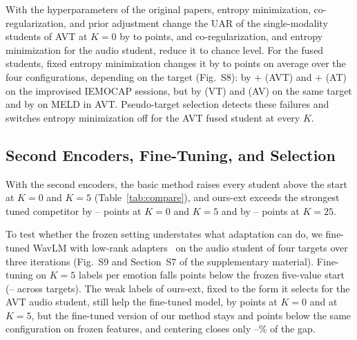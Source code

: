 With the hyperparameters of the original papers, entropy minimization, co-regularization, and prior adjustment change the UAR of the single-modality students of AVT at $K=0$ by  to  points, and co-regularization, and entropy minimization for the audio student, reduce it to chance level.
For the fused students, fixed entropy minimization changes it by  to  points on average over the four configurations, depending on the target (Fig.~S8): by $+$ (AVT) and $+$ (AT) on the improvised IEMOCAP sessions, but by  (VT) and  (AV) on the same target and by  on MELD in AVT.
Pseudo-target selection detects these failures and switches entropy minimization off for the AVT fused student at every $K$.


\subsection{Second Encoders, Fine-Tuning, and Selection}
\label{sec:comparison-robust}

With the second encoders, the basic method raises every student above the start at $K=0$ and $K=5$ (Table~\ref{tab:compare}), and ours-ext exceeds the strongest tuned competitor by -- points at $K=0$ and $K=5$ and by -- points at $K=25$.

To test whether the frozen setting understates what adaptation can do, we fine-tuned WavLM with low-rank adapters~\cite{hu2022lora} on the audio student of four targets over three iterations (Fig.~S9 and Section~S7 of the supplementary material).
Fine-tuning on $K=5$ labels per emotion falls  points below the frozen five-value start (-- across targets).
The weak labels of ours-ext, fixed to the form it selects for the AVT audio student, still help the fine-tuned model, by  points at $K=0$ and  at $K=5$, but the fine-tuned version of our method stays  and  points below the same configuration on frozen features, and centering closes only --\% of the gap.


